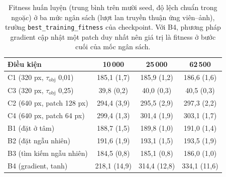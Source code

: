 \begin{table}[t]
\centering\small
\caption{Fitness huấn luyện (trung bình trên mười seed, độ lệch chuẩn trong ngoặc) ở ba mức ngân sách (lượt lan truyền thuận ứng viên--ảnh), trường \texttt{best\_training\_fitness} của checkpoint. Với B4, phương pháp gradient cập nhật một patch duy nhất nên giá trị là fitness ở bước cuối của mốc ngân sách.}
\label{tab:train}
\begin{tabular}{@{}lccc@{}}
\toprule
Điều kiện & 10\,000 & 25\,000 & 62\,500 \\
\midrule
C1 (320 px, $\tau_{\mathrm{obj}}$ 0,01) & 185,1 (1,7) & 185,9 (1,2) & 186,6 (1,6) \\
C3 (320 px, $\tau_{\mathrm{obj}}$ 0,25) & 39,8 (0,2) & 40,0 (0,3) & 40,5 (0,3) \\
C2 (640 px, patch 128 px) & 294,4 (3,9) & 295,5 (2,9) & 297,3 (2,2) \\
C4 (640 px, patch 64 px) & 299,4 (1,3) & 301,4 (1,9) & 303,1 (1,7) \\
B1 (đặt ở tâm) & 188,7 (1,5) & 189,8 (1,0) & 191,0 (1,4) \\
B2 (đặt ngẫu nhiên) & 191,6 (1,9) & 193,1 (1,5) & 193,5 (1,9) \\
B3 (tìm kiếm ngẫu nhiên) & 184,5 (0,8) & 185,1 (0,8) & 186,0 (1,0) \\
B4 (gradient, tanh) & 218,1 (14,9) & 314,4 (12,8) & 334,1 (11,6) \\
\bottomrule
\end{tabular}
\end{table}
